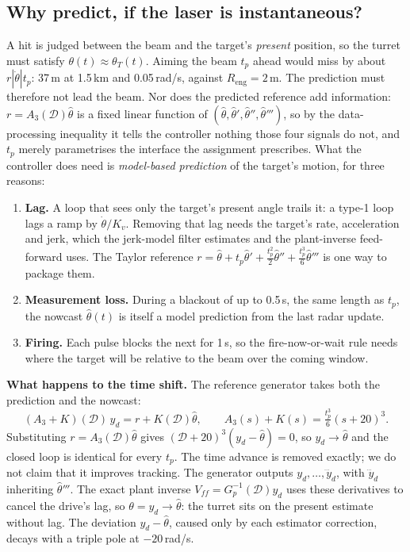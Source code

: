 \documentclass[11pt,a4paper]{article}
\newcommand{\Reng}{R_{\mathrm{eng}}}
\newcommand{\D}{\mathcal{D}}
\begin{document}
\subsection{Why predict, if the laser is instantaneous?}
\label{sec:whypredict}
A hit is judged between the beam and the target's \emph{present} position, so the turret must satisfy $\theta(t)\approx\theta_T(t)$. Aiming the beam $t_p$ ahead would miss by about $r|\dot\theta|t_p$: 37\,m at 1.5\,km and 0.05\,rad/s, against $\Reng=2$\,m. The prediction must therefore not lead the beam. Nor does the predicted reference add information: $r=A_3(\D)\hat\theta$ is a fixed linear function of $(\hat\theta,\hat\theta',\hat\theta'',\hat\theta''')$, so by the data-processing inequality it tells the controller nothing those four signals do not, and $t_p$ merely parametrises the interface the assignment prescribes. What the controller does need is \emph{model-based prediction} of the target's motion, for three reasons:
\begin{enumerate}
\item \textbf{Lag.} A loop that sees only the target's present angle trails it: a type-1 loop lags a ramp by $\dot\theta/K_v$. Removing that lag needs the target's rate, acceleration and jerk, which the jerk-model filter estimates and the plant-inverse feed-forward uses. The Taylor reference $r=\hat\theta+t_p\hat\theta'+\tfrac{t_p^2}{2}\hat\theta''+\tfrac{t_p^3}{6}\hat\theta'''$ is one way to package them.
\item \textbf{Measurement loss.} During a blackout of up to 0.5\,s, the same length as $t_p$, the nowcast $\hat\theta(t)$ is itself a model prediction from the last radar update.
\item \textbf{Firing.} Each pulse blocks the next for 1\,s, so the fire-now-or-wait rule needs where the target will be relative to the beam over the coming window.
\end{enumerate}
\textbf{What happens to the time shift.} The reference generator takes both the prediction and the nowcast:
\[ (A_3+K)(\D)\,y_d=r+K(\D)\hat\theta,\qquad A_3(s)+K(s)=\tfrac{t_p^3}{6}(s+20)^3 . \]
Substituting $r=A_3(\D)\hat\theta$ gives $(\D+20)^3(y_d-\hat\theta)=0$, so $y_d\to\hat\theta$ and the closed loop is identical for every $t_p$. The time advance is removed exactly; we do not claim that it improves tracking. The generator outputs $y_d,\dots,\dddot y_d$, with $\dddot y_d$ inheriting $\hat\theta'''$. The exact plant inverse $V_{ff}=G_p^{-1}(\D)y_d$ uses these derivatives to cancel the drive's lag, so $\theta=y_d\to\hat\theta$: the turret sits on the present estimate without lag. The deviation $y_d-\hat\theta$, caused only by each estimator correction, decays with a triple pole at $-20$\,rad/s.
\end{document}
